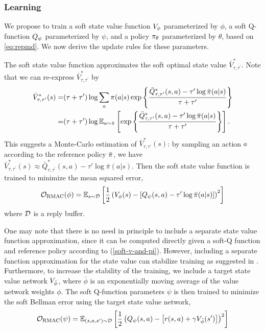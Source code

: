 
\subsubsection{Learning}
We propose to train a soft state value function $V_{\phi}$ parameterized by $\phi$, a soft Q-function $Q_{\psi}$ parameterized by $\psi$, and a policy $\pi_{\theta}$ parameterized by $\theta$, based on \cref{eq:repmd}. We now derive the update rules for these parameters. 

The soft state value function approximates the soft optimal state value $\bar{V}_{\tau,\tau^{\prime}}^*$. Note that we can re-express $\bar{V}_{\tau,\tau^{\prime}}^*$ by 
\begin{align*}
\bar{V}_{\tau,\tau^{\prime}}^*(s) = & (\tau + \tau') \log \sum_a \pi(a|s) \exp \left\{ \frac{\bar{Q}_{\tau,\tau^{\prime}}^*(s,a) - \tau' \log \bar{\pi}(a|s)} {\tau + \tau'} \right\} \\ 
= & (\tau + \tau') \log \mathbb{E} _ {a\sim \bar{\pi}} \left[ \exp \left\{ \frac{\bar{Q}_{\tau,\tau^{\prime}}^*(s,a) - \tau' \log \bar{\pi}(a|s)} {\tau + \tau'} \right\} \right].
\end{align*}
This suggests a Monte-Carlo estimation of $\bar{V}_{\tau,\tau^{\prime}}^*(s)$: by sampling an action $a$ according to the reference policy $\bar{\pi}$, we have $\bar{V}_{\tau,\tau^{\prime}}^*(s) \approx  \bar{Q}_{\tau,\tau^{\prime}}^*(s,a) - \tau' \log \bar{\pi}(a|s) $. Then the soft state value function is trained to minimize the mean squared error,
\begin{equation*}
{\mathcal{O}}_{\text{RMAC}} (\phi) = \mathbb{E}_{s\sim {\mathcal{D}}} \left[ \frac{1}{2} \left( V_{\phi}(s) -  \left[ Q_{\psi}(s,a ) - \tau' \log \bar{\pi}(a|s) \right] \right)^2 \right]
\end{equation*}
where ${\mathcal{D}}$ is a reply buffer. 

One may note that there is no need in principle to include a separate state value function approximation, since it can be computed directly given a soft-Q function and reference policy according to (\ref{soft-v-and-pi}). However, including a separate function approximation for the state value can stabilize training as suggested in \citep{haarnoja2018soft}. 
Furthermore, to increase the stability of the training, we include a target state value network $V_{\bar{\phi}}$, where $\bar{\phi}$ is an exponentially moving average of the value network weights $\phi$. 
The soft Q-function parameters $\psi$ is then trained to minimize the soft Bellman error using the target state value network,
\begin{equation*}
{\mathcal{O}}_{\text{RMAC}} (\psi) = \mathbb{E}_{(s,a,s') \sim {\mathcal{D}}} \left[ \frac{1}{2} \left( Q_{\psi}(s,a) - \left[r(s,a) + \gamma V_{\bar{\phi}}(s') \right] \right)^2 \right]
\end{equation*}

